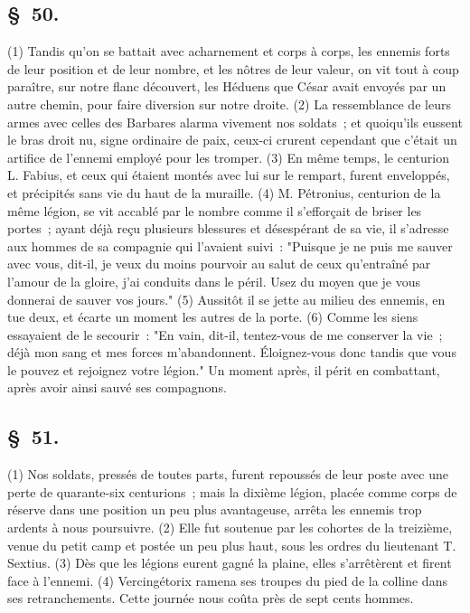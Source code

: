 \documentclass[french,twoside]{book} %
\begin{document}
\subsection[{§ 50.}]{ \textsc{§ 50.} }
\noindent (1) Tandis qu’on se battait avec acharnement et corps à corps, les ennemis forts de leur position et de leur nombre, et les nôtres de leur valeur, on vit tout à coup paraître, sur notre flanc découvert, les Héduens que César avait envoyés par un autre chemin, pour faire diversion sur notre droite. (2) La ressemblance de leurs armes avec celles des Barbares alarma vivement nos soldats ; et quoiqu’ils eussent le bras droit nu, signe ordinaire de paix, ceux-ci crurent cependant que c’était un artifice de l’ennemi employé pour les tromper. (3) En même temps, le centurion L. Fabius, et ceux qui étaient montés avec lui sur le rempart, furent enveloppés, et précipités sans vie du haut de la muraille. (4) M. Pétronius, centurion de la même légion, se vit accablé par le nombre comme il s’efforçait de briser les portes ; ayant déjà reçu plusieurs blessures et désespérant de sa vie, il s’adresse aux hommes de sa compagnie qui l’avaient suivi : "Puisque je ne puis me sauver avec vous, dit-il, je veux du moins pourvoir au salut de ceux qu’entraîné par l’amour de la gloire, j’ai conduits dans le péril. Usez du moyen que je vous donnerai de sauver vos jours." (5) Aussitôt il se jette au milieu des ennemis, en tue deux, et écarte un moment les autres de la porte. (6) Comme les siens essayaient de le secourir : "En vain, dit-il, tentez-vous de me conserver la vie ; déjà mon sang et mes forces m’abandonnent. Éloignez-vous donc tandis que vous le pouvez et rejoignez votre légion." Un moment après, il périt en combattant, après avoir ainsi sauvé ses compagnons.
\subsection[{§ 51.}]{ \textsc{§ 51.} }
\noindent (1) Nos soldats, pressés de toutes parts, furent repoussés de leur poste avec une perte de quarante-six centurions ; mais la dixième légion, placée comme corps de réserve dans une position un peu plus avantageuse, arrêta les ennemis trop ardents à nous poursuivre. (2) Elle fut soutenue par les cohortes de la treizième, venue du petit camp et postée un peu plus haut, sous les ordres du lieutenant T. Sextius. (3) Dès que les légions eurent gagné la plaine, elles s’arrêtèrent et firent face à l’ennemi. (4) Vercingétorix ramena ses troupes du pied de la colline dans ses retranchements. Cette journée nous coûta près de sept cents hommes.
\end{document}
